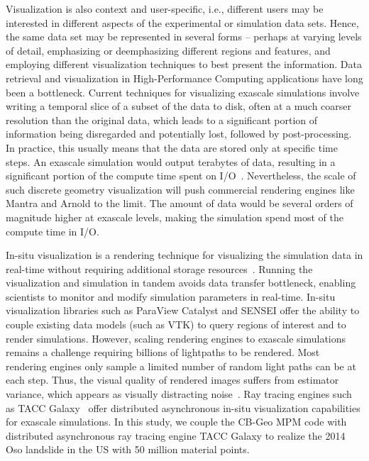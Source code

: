 \documentclass[journal]{IEEEtran}
\begin{document}
Visualization is also context and user-specific, i.e., different users may be interested in different aspects of the experimental or simulation data sets. Hence, the same data set may be represented in several forms – perhaps at varying levels of detail, emphasizing or deemphasizing different regions and features, and employing different visualization techniques to best present the information. Data retrieval and visualization in High-Performance Computing applications have long been a bottleneck. Current techniques for visualizing exascale simulations involve writing a temporal slice of a subset of the data to disk, often at a much coarser resolution than the original data, which leads to a significant portion of information being disregarded and potentially lost, followed by post-processing. In practice, this usually means that the data are stored only at specific time steps. An exascale simulation would output terabytes of data, resulting in a significant portion of the compute time spent on I/O~\cite{byna2020exahdf5}. Nevertheless, the scale of such discrete geometry visualization will push commercial rendering engines like Mantra and Arnold to the limit. The amount of data would be several orders of magnitude higher at exascale levels, making the simulation spend most of the compute time in I/O.

In-situ visualization is a rendering technique for visualizing the simulation data in real-time without requiring additional storage resources~\cite{abram2018galaxy,atzori2021situ,kress2019comparing}. Running the visualization and simulation in tandem avoids data transfer bottleneck, enabling scientists to monitor and modify simulation parameters in real-time. In-situ visualization libraries such as ParaView Catalyst and SENSEI offer the ability to couple existing data models (such as VTK) to query regions of interest and to render simulations. However, scaling rendering engines to exascale simulations remains a challenge requiring billions of lightpaths to be rendered. Most rendering engines only sample a limited number of random light paths can be at each step. Thus, the visual quality of rendered images suffers from estimator variance, which appears as visually distracting noise~\cite{yang2021foveated}. Ray tracing engines such as TACC Galaxy~\cite{abram2018galaxy} offer distributed asynchronous in-situ visualization capabilities for exascale simulations. In this study, we couple the CB-Geo MPM code with distributed asynchronous ray tracing engine TACC Galaxy to realize the 2014 Oso landslide in the US with 50 million material points.
  
\end{document}
